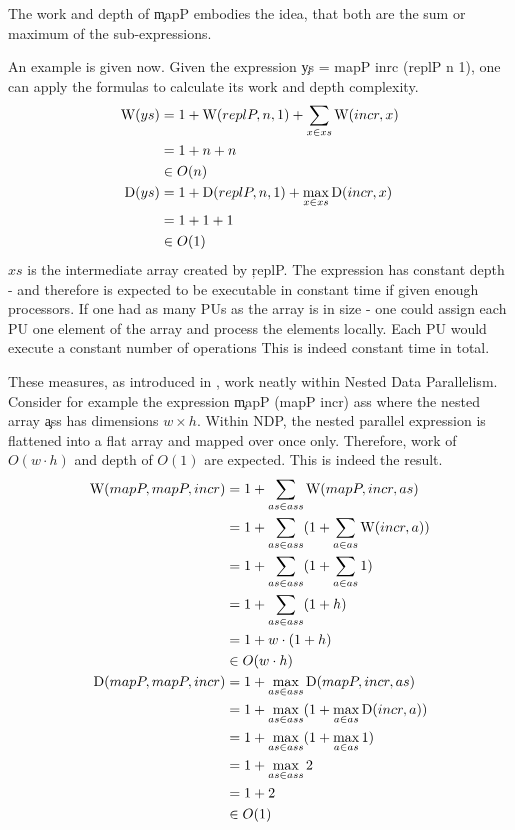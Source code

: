   The work and depth of \c{mapP} embodies the idea, that both are the sum or maximum of the sub-expressions.
  
  An example is given now. Given the expression
  \c{ys = mapP inrc (replP n 1)}, one can apply
  the formulas to calculate its work and depth complexity.
  \begin{equation*}
  \begin{split}
  \textrm{W}(ys)
        & = 1 + \textrm{W}(replP,n,1) + \sum_{x \in xs}\textrm{W}(incr,x) \\
        & = 1 + n + n \\
        & \in O(n) \\
  \textrm{D}(ys) & = 1 + \textrm{D}(replP,n,1) + \max_{x \in xs}\textrm{D}(incr,x) \\
      & = 1 + 1 + 1 \\
      & \in O(1) \\
  \end{split}
  \end{equation*}
  $xs$ is the intermediate array created by \c{replP}.
  The expression has constant depth - and therefore
  is expected to be executable in constant time if given enough processors.
  If one had as many PUs as the array is in size
  - one could assign each PU one element of the array and process
  the elements locally. Each PU would execute a constant number of operations
  This is indeed constant time in total.
  
  These measures, as introduced in \cite{Belloch1996}, work
  neatly within Nested Data Parallelism. Consider for example the
  expression \c{mapP (mapP incr) ass} where the
  nested array \c{ass} has dimensions $w \times h$.
  Within NDP, the nested parallel expression is flattened into a
  flat array and mapped over once only.
  Therefore, work of $O(w \cdot h)$ and depth of $O(1)$ are expected.
  This is indeed the result.
  \begin{equation*}
  \begin{split}
  \textrm{W}(mapP,mapP,incr)
        & = 1 + \sum_{as \in ass}\textrm{W}(mapP,incr,as) \\
        & = 1 + \sum_{as \in ass}(1 + \sum_{a \in as} \textrm{W}(incr,a)) \\
        & = 1 + \sum_{as \in ass}(1 + \sum_{a \in as} 1) \\
        & = 1 + \sum_{as \in ass}(1 + h) \\
        & = 1 + w \cdot (1 + h) \\
        & \in O(w \cdot h) \\
  \textrm{D}(mapP,mapP,incr) & = 1 + \max_{as \in ass}\textrm{D}(mapP,incr,as) \\
        & = 1 + \max_{as \in ass}(1 + \max_{a \in as} \textrm{D}(incr,a)) \\
        & = 1 + \max_{as \in ass}(1 + \max_{a \in as} 1) \\
        & = 1 + \max_{as \in ass}2 \\
        & = 1 + 2 \\
        & \in O(1) \\
  \end{split}
  \end{equation*}
  
